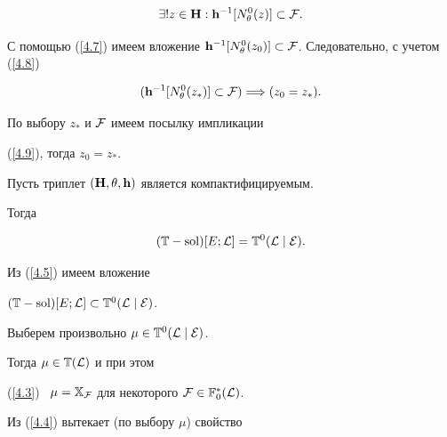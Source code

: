 {\begin{pf}
\begin{equation}
\exi{!z} \in {\bold H}:{{\bold h}^{-1}}[{N_\theta^0}(z)] \subset {\cal F}.


\end{equation}


С помощью (\ref{4.7}) имеем вложение ${{\bold h}^{-1}}[{N_\theta^0}(z_0)]


\subset {\cal F}$. Следовательно, с учетом (\ref{4.8})


\begin{equation}


\label{4.9}


({{\bold h}^{-1}}[{N_\theta^0}(z_*)] \subset {\cal F}) \Lo


({z_0} = {z_*}).


\end{equation}


По выбору $z_*$ и ${\cal F}$ имеем посылку импликации


(\ref{4.9}), тогда ${z_0} = {z_*}$.


\end{pf}








\begin{thms}


Пусть триплет $({\bold H},\theta,{\bold h})$ является компактифицируемым.


Тогда


$$


({\Bbb T}-\sol)[E;{\cal L}] = {{\Bbb T}^0}({\cal L}\mid{\cal E}).


$$


\end{thms}








\begin{pf}


Из (\ref{4.5}) имеем вложение


$({\Bbb T}-\operatorname{sol})[E;{\cal L}] \subset {{\Bbb T}^0}({\cal L}\mid{\cal E})$.


Выберем произвольно $\mu \in {{\Bbb T}^0}({\cal L}\mid{\cal E})$.


Тогда $\mu \in {{\Bbb T}({\cal L})}$  и при этом


(\ref{4.3}) \ $\mu = {{\Bbb X}_{\cal F}}$ для некоторого ${\cal F} \in


{{\Bbb F}_0^*}({\cal L})$.


Из (\ref{4.4}) вытекает (по выбору $\mu$) свойство



\end{pf}}
